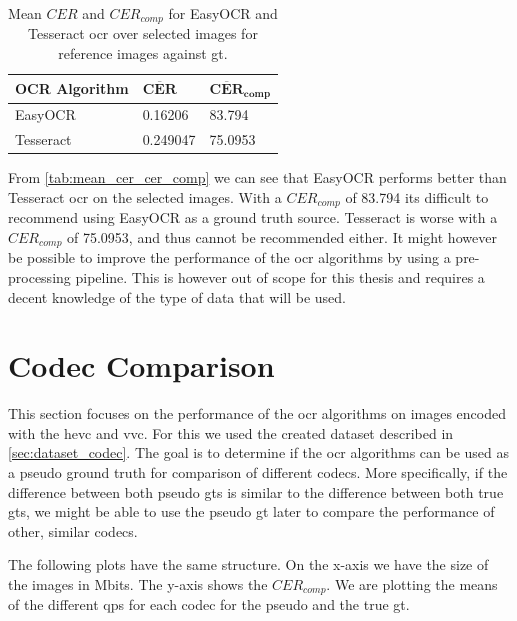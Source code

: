\begin{table}[h]
\centering
\begin{tabular}{|l|l|l|}
    \hline
    \rule{0em}{1em} \textbf{OCR Algorithm} & $\mathbf{\overline{CER}}$ & $\mathbf{\overline{CER}_{comp}}$ \\
    \hline
    EasyOCR & 0.16206 & 83.794 \\
    \hline
    Tesseract & 0.249047 & 75.0953 \\
    \hline
\end{tabular}
\caption{Mean $CER$ and $CER_{comp}$ for EasyOCR and Tesseract \gls{ocr} over selected images for reference images against \gls{gt}.}
\label{tab:mean_cer_cer_comp}
\end{table}

From \autoref{tab:mean_cer_cer_comp} we can see that EasyOCR performs better than Tesseract \gls{ocr} on the selected images.
With a $CER_{comp}$ of 83.794 its difficult to recommend using EasyOCR as a ground truth source.
Tesseract is worse with a $CER_{comp}$ of 75.0953, and thus cannot be recommended either.
It might however be possible to improve the performance of the \gls{ocr} algorithms by using a pre-processing pipeline.
This is however out of scope for this thesis and requires a decent knowledge of the type of data that will be used.

\section{Codec Comparison}
\label{sec:codec_comparison}

This section focuses on the performance of the \gls{ocr} algorithms on images encoded with the \gls{hevc} and \gls{vvc}.
For this we used the created dataset described in \autoref{sec:dataset_codec}.
The goal is to determine if the \gls{ocr} algorithms can be used as a pseudo ground truth for comparison of different codecs.
More specifically, if the difference between both pseudo \glspl{gt} is similar to the difference between both true \glspl{gt}, we might be able to use the pseudo \gls{gt} later to compare the performance of other, similar codecs.

The following plots have the same structure.
On the x-axis we have the size of the images in Mbits.
The y-axis shows the $CER_{comp}$.
We are plotting the means of the different \glspl{qp} for each codec for the pseudo and the true \gls{gt}.


